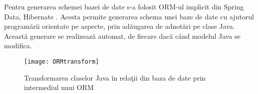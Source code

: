 Pentru generarea schemei bazei de date s-a folosit ORM-ul implicit din Spring Data, Hibernate \autocite{hibernate} . Acesta permite generarea schema unei baze de date cu ajutorul programării orientate pe aspecte, prin adăugarea de adnotări pe clase Java. Această generare se realizează automat, de fiecare dacă când modelul Java se modifica.
\begin{figure}[H]
	\centering
	\texttt{[image: ORMtransform]}
	\captionsetup{justification=centering}
	\caption{Transformarea claselor Java în relaţii din baza de date prin intermediul unui ORM}
	\label{fig:ORMtransform}
\end{figure}


